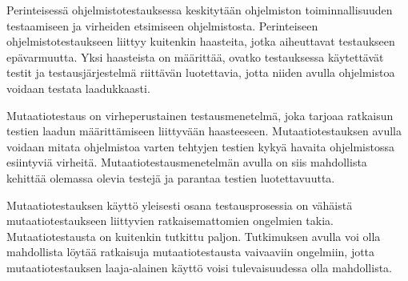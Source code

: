 \documentclass[finnish, grading]{tktltiki2}
\theoremstyle{definition}
\theoremstyle{remark}
\begin{document}
Perinteisessä ohjelmistotestauksessa keskitytään ohjelmiston toiminnallisuuden testaamiseen ja virheiden etsimiseen ohjelmistosta. Perinteiseen ohjelmistotestaukseen liittyy kuitenkin haasteita, jotka aiheuttavat testaukseen epävarmuutta. Yksi haasteista on määrittää, ovatko testauksessa käytettävät testit ja testausjärjestelmä riittävän luotettavia, jotta niiden avulla ohjelmistoa voidaan testata laadukkaasti.

Mutaatiotestaus on virheperustainen testausmenetelmä, joka tarjoaa ratkaisun testien laadun määrittämiseen liittyvään haasteeseen. Mutaatiotestauksen avulla voidaan mitata ohjelmistoa varten tehtyjen testien kykyä havaita ohjelmistossa esiintyviä virheitä. Mutaatiotestausmenetelmän avulla on siis mahdollista kehittää olemassa olevia testejä ja parantaa testien luotettavuutta.

Mutaatiotestauksen käyttö yleisesti osana testausprosessia on vähäistä mutaatiotestaukseen liittyvien ratkaisemattomien ongelmien takia. Mutaatiotestausta on kuitenkin tutkittu paljon. Tutkimuksen avulla voi olla mahdollista löytää ratkaisuja mutaatiotestausta vaivaaviin ongelmiin, jotta mutaatiotestauksen laaja-alainen käyttö voisi tulevaisuudessa olla mahdollista.




\end{document}
